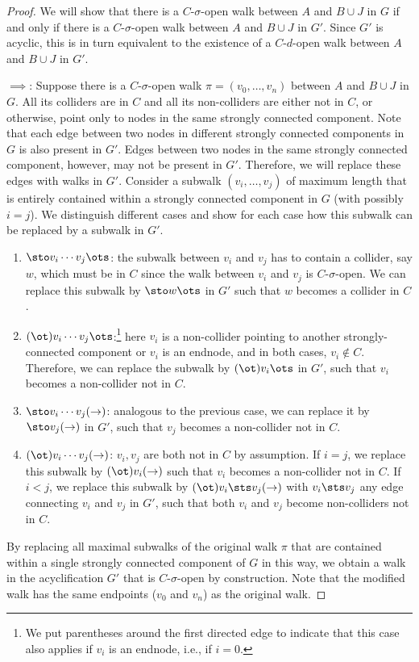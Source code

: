 \begin{proof}
We will show that there is a $C$-$\sigma$-open walk between $A$ and $B \cup J$ in $G$ if and only
if there is a $C$-$\sigma$-open walk between $A$ and $B \cup J$ in $G'$. Since $G'$ is acyclic, this
is in turn equivalent to the existence of a $C$-$d$-open walk between $A$ and $B \cup J$ in $G'$.

$\implies$: Suppose there is a $C$-$\sigma$-open walk $\pi = (v_0, \dots, v_n)$ between $A$ and $B \cup J$ in $G$. 
All its colliders are in $C$
and all its non-colliders are either not in $C$, or otherwise, point only to nodes in the same strongly connected component.
Note that each edge between two nodes in different strongly connected components in $G$ is also present in $G'$.
Edges between two nodes in the same strongly connected component, however, may not be present in $G'$.
Therefore, we will replace these edges with walks in $G'$. 
Consider a subwalk $(v_i,\dots,v_j)$ of maximum length that is entirely contained within a strongly connected component in $G$
(with possibly $i=j$).
We distinguish different cases and show for each case how this subwalk can be replaced by a subwalk in $G'$.
\begin{enumerate}[label=(\roman*)]
  \item 
$\sto v_i \cdots v_j \ots$: the subwalk between $v_i$ and $v_j$ has to contain a collider, say $w$,
which must be in $C$ since the walk between $v_i$ and $v_j$ is $C$-$\sigma$-open.
We can replace this subwalk by $\sto w \ots$ in $G'$ such that $w$ becomes a collider in $C$.

\item
$(\ot) v_i \cdots v_j \ots$:\footnote{We put parentheses around the first directed edge to indicate that
this case also applies if $v_i$ is an endnode, i.e., if $i = 0$.} 
here $v_i$ is a non-collider pointing to another strongly-connected component or $v_i$ is an endnode,
and in both cases, $v_i \notin C$. Therefore, we can replace the subwalk by $(\ot) v_i \ots$ in $G'$,
such that $v_i$ becomes a non-collider not in $C$.

\item
$\sto v_i \cdots v_j (\to)$: analogous to the previous case, we can replace it by $\sto v_j (\to)$ in $G'$,
such that $v_j$ becomes a non-collider not in $C$.

\item
$(\ot) v_i \cdots v_j (\to)$: 
$v_i,v_j$ are both not in $C$ by assumption. If $i = j$, we replace this subwalk by $(\ot) v_i (\to)$ 
such that $v_i$ becomes a non-collider not in $C$. If $i < j$, we replace this subwalk by
$(\ot) v_i \sts v_j (\to)$ with $v_i \sts v_j$ any edge connecting $v_i$ and $v_j$ in $G'$,
such that both $v_i$ and $v_j$ become non-colliders not in $C$.
\end{enumerate}
By replacing all maximal subwalks of the original walk $\pi$ that are contained within a single strongly connected
component of $G$ in this way, we obtain a walk in the acyclification $G'$ that is $C$-$\sigma$-open by construction.
Note that the modified walk has the same endpoints ($v_0$ and $v_n$) as the original walk.


\end{proof}
